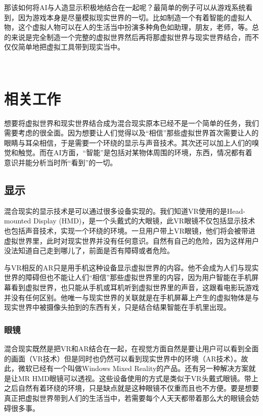 \documentclass{llncs}
\begin{document}
那该如何将AI与人造显示积极地结合在一起呢？最简单的例子可以从游戏系统看到，因为游戏本身是尽量模拟现实世界的一切。比如制造一个有着智能的虚拟人物，这个虚拟人物可以在人的生活当中扮演多种角色如助理，朋友，老师，等。总的来说是完全制造一个完整的虚拟世界然后再将那虚拟世界与现实世界结合，而不仅仅简单地把虚拟工具带到现实当中。

\

\section{相关工作}

想要将虚拟世界和现实世界结合成为混合现实原本已经不是一个简单的任务，我们需要考虑的很全面。因为想要让人们觉得以及“相信”那些虚拟世界首次需要让人的眼睛与耳朵相信，于是需要一个环绕的显示与声音技术。其次还可以加上人们的嗅觉和触觉。而在AI方面，“智能”是包括对某物体周围的环境，东西，情况都有着意识并能分析当时所“看到”的一切。

\subsection{显示}

混合现实的显示技术是可以通过很多设备实现的。我们知道VR使用的是Head-mounted Display (HMD)\cite{hoellwarth2015head}，是一个头戴式的大眼镜，此VR眼镜不仅包括显示技术也包括声音技术，实现一个环绕的环境。一旦用户带上VR眼镜，他们将会被带进虚拟世界里，此时对现实世界并没有任何意识。自然有自己的危险，因为这样用户没法知道自己走到哪儿了，前面是否有障碍或者危险。

与VR相反的AR只是用手机这种设备显示虚拟世界的内容。他不会成为人们与现实世界的障碍但也不能让人们“相信”那些虚拟世界里的内容，因为用户智能在手机屏幕看到虚拟世界，也只能从手机或耳机听到虚拟世界里的声音，这跟看电影玩游戏并没有任何区别。他唯一与现实世界的关联就是在手机屏幕上产生的虚拟物体是与现实世界中被摄像头拍到的东西有关，只是结合结果智能在手机里出现\cite{cohen2009interactivity}。

\subsubsection{眼镜}
混合现实既然是把VR和AR结合在一起，在视觉方面自然是要让用户可以看到全面的画面（VR技术）但是同时也仍然可以看到现实世界中的环境（AR技术）。故此，微软已经有一个叫做Windows Mixed Reality的产品。还有另一种解决方案就是让MR HMD眼镜可以透视\cite{DBLP:conf/ismar/ZhouDB08}。这些设备使用的方式是类似于VR头戴式眼镜\cite{kress2019mixed}。带上之后自然有着环绕的环境，只是缺点就是这种眼镜不仅重而且也不方便。要是想要真正把虚拟世界带到人们的生活当中，若需要每个人天天都带着那么大的眼镜会妨碍很多事\cite{olshannikova2015visualizing}。
\end{document}
